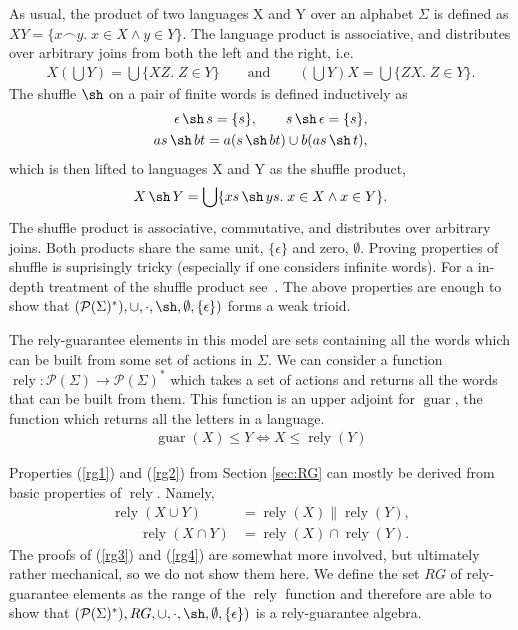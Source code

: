 \documentclass{llncs}
\DeclareMathOperator{\sha}{\sh}
\DeclareMathOperator{\rely}{rely}
\DeclareMathOperator{\guar}{guar}
\begin{document}
As usual, the product of two languages X and Y over an alphabet
$\Sigma$ is defined as $XY = \{x\frown y.\; x \in X \land y \in Y\}$.
The language product is associative, and distributes over arbitrary
joins from both the left and the right, i.e.
\begin{align*}
X(\bigcup Y) = \bigcup\{XZ.\; Z \in Y\} \qquad \text{and} \qquad (\bigcup Y)X = \bigcup\{ZX.\; Z \in Y\}.
\end{align*}
The shuffle $\sha$ on a pair
of finite words is defined inductively as
\begin{align*}
\epsilon \sha s = \{s\}, \qquad s \sha \epsilon = \{s\},\\
as \sha bt = a(s \sha bt) \cup b(as \sha t),
\end{align*}
which is then lifted to languages X and Y as the shuffle product,
\begin{align*}
X \sha Y = \bigcup\{xs \sha ys.\; x \in X \land x \in Y\}.
\end{align*}
The shuffle product is associative, commutative, and distributes over
arbitrary joins. Both products share the same unit, $\{\epsilon\}$ and
zero, $\emptyset$. Proving properties of shuffle is suprisingly
tricky (especially if one considers infinite words). For a in-depth
treatment of the shuffle product see~\cite{shufflethings}. The
above properties are enough to show that $(\mathcal{P}(\Sigma)^*),
\cup, \cdot,\sha, \emptyset, \{\epsilon\})$ forms a weak trioid.

The rely-guarantee elements in this model are sets containing all the
words which can be built from some set of actions in $\Sigma$. We can
consider a function $\rely : \mathcal{P}(\Sigma) \to
\mathcal{P}(\Sigma)^*$ which takes a set of actions and returns all
the words that can be built from them. This function is an upper
adjoint for $\guar$, the function which returns all the letters in a
language.
\begin{align*}
\guar(X) \le Y \iff X \le \rely(Y)
\end{align*}

Properties (\ref{rg1}) and (\ref{rg2}) from Section \ref{sec:RG} can
mostly be derived from basic properties of $\rely$. Namely,
\begin{align*}
\rely(X \cup Y) &= \rely(X) \| \rely(Y),\\
\qquad \rely(X \cap Y) &= \rely(X) \cap \rely(Y).
\end{align*}
The proofs of (\ref{rg3}) and (\ref{rg4}) are somewhat more involved,
but ultimately rather mechanical, so we do not show them here. We
define the set $RG$ of rely-guarantee elements as the range of the
$\rely$ function and therefore are able to show that $(\mathcal{P}(\Sigma)^*), RG, \cup,
\cdot,\sha, \emptyset, \{\epsilon\})$ is a rely-guarantee algebra.
\end{document}
